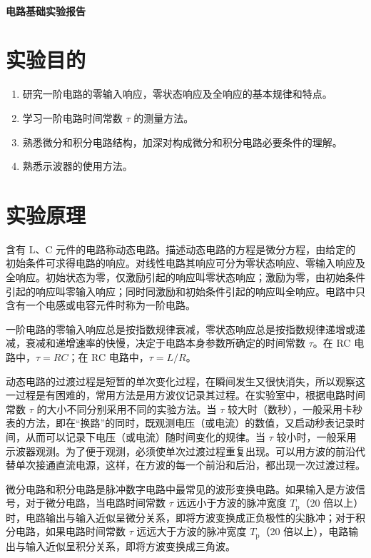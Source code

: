 \documentclass[a4paper,utf8]{article}
\begin{document}
\begin{center}
    {\mbox{}\\[7em]\bfseries\songti%
    电路基础实验报告}\\[34mm]
\end{center}
\newpage
\section{实验目的}
\begin{enumerate}
    \item 研究一阶电路的零输入响应，零状态响应及全响应的基本规律和特点。
    \item 学习一阶电路时间常数 $\tau$ 的测量方法。
    \item 熟悉微分和积分电路结构，加深对构成微分和积分电路必要条件的理解。
    \item 熟悉示波器的使用方法。
\end{enumerate}

\section{实验原理}%
含有 L、C 元件的电路称动态电路。描述动态电路的方程是微分方程，由给定的初始条件可求得电路的响应。对线性电路其响应可分为零状态响应、零输入响应及全响应。初始状态为零，仅激励引起的响应叫零状态响应；激励为零，由初始条件引起的响应叫零输入响应；同时同激励和初始条件引起的响应叫全响应。电路中只含有一个电感或电容元件时称为一阶电路。\par
一阶电路的零输入响应总是按指数规律衰减，零状态响应总是按指数规律递增或递减，衰减和递增速率的快慢，决定于电路本身参数所确定的时间常数 $\tau$。在 RC 电路中，$\tau=RC$；在 RC 电路中，$\tau=L/R$。\par
动态电路的过渡过程是短暂的单次变化过程，在瞬间发生又很快消失，所以观察这一过程是有困难的，常用方法是用方波仪记录其过程。在实验室中，根据电路时间常数 $\tau$ 的大小不同分别采用不同的实验方法。当 $\tau$ 较大时（数秒），一般采用卡秒表的方法，即在“换路”的同时，既观测电压（或电流）的数值，又启动秒表记录时间，从而可以记录下电压（或电流）随时间变化的规律。当 $\tau$ 较小时，一般采用示波器观测。为了便于观测，必须使单次过渡过程重复出现。可以用方波的前沿代替单次接通直流电源，这样，在方波的每一个前沿和后沿，都出现一次过渡过程。\par
微分电路和积分电路是脉冲数字电路中最常见的波形变换电路。如果输入是方波信号，对于微分电路，当电路时间常数 $\tau$ 远远小于方波的脉冲宽度 $T_\text{p}$（20 倍以上）时，电路输出与输入近似呈微分关系，即将方波变换成正负极性的尖脉冲；对于积分电路，如果电路时间常数 $\tau$ 远远大于方波的脉冲宽度 $T_\text{p}$（20 倍以上），电路输出与输入近似呈积分关系，即将方波变换成三角波。
\end{document}
